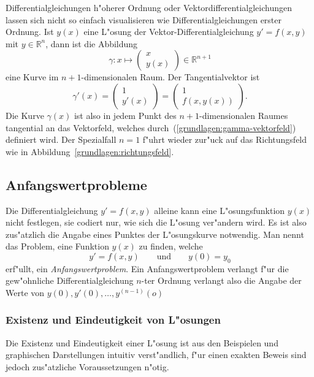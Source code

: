 Differentialgleichungen h"oherer Ordnung oder Vektordifferentialgleichungen
lassen sich nicht so einfach visualisieren wie Differentialgleichungen
erster Ordnung.
Ist $y(x)$ eine L"osung der Vektor-Differentialgleichung $y'=f(x,y)$
mit $y\in\mathbb R^n$, dann ist die Abbildung
\[
\gamma\colon
x\mapsto\begin{pmatrix}
x\\
y(x)
\end{pmatrix}\in\mathbb R^{n+1}
\]
eine Kurve im $n+1$-dimensionalen Raum. 
Der Tangentialvektor ist
\begin{equation}
\gamma'(x)
=
\begin{pmatrix}1\\y'(x)\end{pmatrix}
=
\begin{pmatrix}1\\f(x,y(x))\end{pmatrix}.
\label{grundlagen:gamma-vektorfeld}
\end{equation}
Die Kurve $\gamma(x)$ ist also in jedem Punkt des $n+1$-dimensionalen
Raumes tangential an das Vektorfeld, welches
durch~(\ref{grundlagen:gamma-vektorfeld}) definiert wird.
Der Spezialfall $n=1$ f"uhrt wieder zur"uck auf das Richtungsfeld
wie in Abbildung~\ref{grundlagen:richtungsfeld}.

\subsection{Anfangswertprobleme\label{section:anfangswertprobleme}}
Die Differentialgleichung $y'=f(x,y)$ alleine kann eine L"osungsfunktion
$y(x)$ nicht festlegen, sie codiert nur, wie sich die L"osung ver"andern wird.
Es ist also zus"atzlich die Angabe eines Punktes der L"osungskurve
notwendig.
Man nennt das Problem, eine Funktion $y(x)$ zu finden, welche
\[
y'=f(x,y)
\qquad
\text{und}
\qquad
y(0)=y_0
\]
erf"ullt, ein {\em Anfangswertproblem}.
Ein Anfangswertproblem verlangt f"ur die gew"ohnliche Differentialgleichung
$n$-ter Ordnung verlangt also die Angabe der Werte von
$y(0),y'(0),\dots,y^{(n-1)}(o)$

\subsubsection{Existenz und Eindeutigkeit von L"osungen}
Die Existenz und Eindeutigkeit einer L"osung ist aus den Beispielen und
graphischen Darstellungen intuitiv verst"andlich, f"ur einen exakten
Beweis sind jedoch zus"atzliche Voraussetzungen n"otig.

